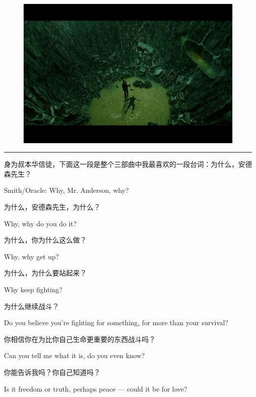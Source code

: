 \documentclass[UTF8]{ctexart}
\newcommand{\myparsep}{\noindent \rule[0.5ex]{\linewidth}{1pt}}
\newenvironment{myquote}{\color{green} \setlength{\leftskip}{6em} \setlength{\rightskip}{4em} \setlength{\parindent}{-2em}}{\par}
\begin{document}
\begin{figure}[htb]
\centering
\includegraphics[width=0.5\linewidth]{fig/ac70b21b694b5d1a8618bfe5.jpg}
\end{figure}

\myparsep

身为叔本华信徒，下面这一段是整个三部曲中我最喜欢的一段台词：为什么，安德森先生？

\begin{myquote}
Smith/Oracle: Why, Mr. Anderson, why?
\end{myquote}

为什么，安德森先生，为什么？

\begin{myquote}
Why, why do you do it?
\end{myquote}

为什么，你为什么这么做？

\begin{myquote}
Why, why get up?
\end{myquote}

为什么，为什么要站起来？

\begin{myquote}
Why keep fighting?
\end{myquote}

为什么继续战斗？

\begin{myquote}
Do you believe you're fighting for something, for more than your survival?
\end{myquote}

你相信你在为比你自己生命更重要的东西战斗吗？

\begin{myquote}
Can you tell me what it is, do you even know?
\end{myquote}

你能告诉我吗？你自己知道吗？

\begin{myquote}
Is it freedom or truth, perhaps peace --- could it be for love?
\end{myquote}
\end{document}
